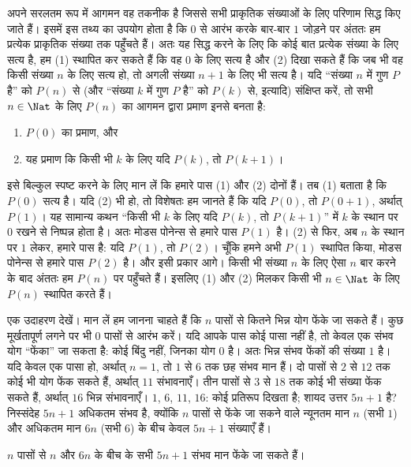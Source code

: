 \documentclass[../../../include/open-logic-section]{subfiles}
\begin{document}


अपने सरलतम रूप में आगमन वह तकनीक है जिससे सभी प्राकृतिक संख्याओं के लिए
परिणाम सिद्ध किए जाते हैं। इसमें इस तथ्य का उपयोग होता है कि $0$ से आरंभ
करके बार-बार $1$ जोड़ने पर अंततः हम प्रत्येक प्राकृतिक संख्या तक पहुँचते
हैं। अतः यह सिद्ध करने के लिए कि कोई बात प्रत्येक संख्या के लिए सत्य है, हम
(1) स्थापित कर सकते हैं कि वह $0$ के लिए सत्य है और (2) दिखा सकते हैं कि
जब भी वह किसी संख्या $n$ के लिए सत्य हो, तो अगली संख्या $n+1$ के लिए भी
सत्य है। यदि ``संख्या $n$ में गुण $P$ है'' को $P(n)$ से (और ``संख्या $k$
में गुण $P$ है'' को $P(k)$ से, इत्यादि) संक्षिप्त करें, तो सभी
$n\in\Nat$ के लिए $P(n)$ का आगमन द्वारा प्रमाण इनसे बनता है:
\begin{enumerate}
\item $P(0)$ का प्रमाण, और
\item यह प्रमाण कि किसी भी $k$ के लिए यदि $P(k)$, तो $P(k+1)$।
\end{enumerate}
इसे बिल्कुल स्पष्ट करने के लिए मान लें कि हमारे पास (1) और (2) दोनों हैं।
तब (1) बताता है कि $P(0)$ सत्य है। यदि (2) भी हो, तो विशेषतः हम जानते हैं
कि यदि $P(0)$, तो $P(0+1)$, अर्थात् $P(1)$। यह सामान्य कथन ``किसी भी $k$
के लिए यदि $P(k)$, तो $P(k+1)$'' में $k$ के स्थान पर $0$ रखने से निष्पन्न
होता है। अतः मोडस पोनेन्स से हमारे पास $P(1)$ है। (2) से फिर, अब $n$ के
स्थान पर $1$ लेकर, हमारे पास है: यदि $P(1)$, तो $P(2)$। चूँकि हमने अभी
$P(1)$ स्थापित किया, मोडस पोनेन्स से हमारे पास $P(2)$ है। और इसी प्रकार
आगे। किसी भी संख्या $n$ के लिए ऐसा $n$ बार करने के बाद अंततः हम $P(n)$ पर
पहुँचते हैं। इसलिए (1) और (2) मिलकर किसी भी $n\in\Nat$ के लिए $P(n)$
स्थापित करते हैं।

एक उदाहरण देखें। मान लें हम जानना चाहते हैं कि $n$ पासों से कितने भिन्न
योग फेंके जा सकते हैं। कुछ मूर्खतापूर्ण लगने पर भी $0$ पासों से आरंभ करें।
यदि आपके पास कोई पासा नहीं है, तो केवल एक संभव योग ``फेंका'' जा सकता है:
कोई बिंदु नहीं, जिनका योग $0$ है। अतः भिन्न संभव फेंकों की संख्या $1$ है।
यदि केवल एक पासा हो, अर्थात् $n=1$, तो $1$ से $6$ तक छह संभव मान हैं। दो
पासों से $2$ से $12$ तक कोई भी योग फेंक सकते हैं, अर्थात् $11$ संभावनाएँ।
तीन पासों से $3$ से $18$ तक कोई भी संख्या फेंक सकते हैं, अर्थात् $16$
भिन्न संभावनाएँ। $1$, $6$, $11$, $16$: कोई प्रतिरूप दिखता है; शायद उत्तर
$5n+1$ है? निस्संदेह $5n+1$ अधिकतम संभव है, क्योंकि $n$ पासों से फेंके जा
सकने वाले न्यूनतम मान $n$ (सभी $1$) और अधिकतम मान $6n$ (सभी $6$) के बीच
केवल $5n+1$ संख्याएँ हैं।

\begin{thm}
  $n$ पासों से $n$ और $6n$ के बीच के सभी $5n+1$ संभव मान फेंके जा सकते
  हैं।
\end{thm}
\end{document}
